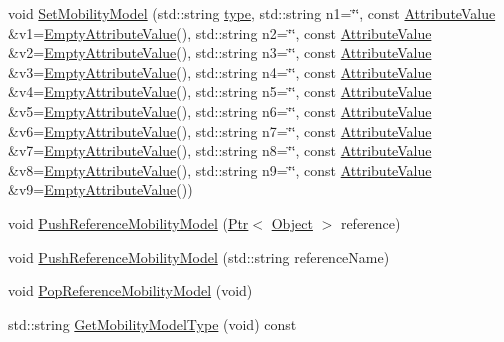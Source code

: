 \begin{DoxyCompactItemize}
void \hyperlink{classns3_1_1MobilityHelper_a030275011b6f40682e70534d30280aba}{Set\+Mobility\+Model} (std\+::string \hyperlink{visualizer-ideas_8txt_add98db9e15e2a58cf2b57623e7aa893a}{type}, std\+::string n1=\char`\"{}\char`\"{}, const \hyperlink{classns3_1_1AttributeValue}{Attribute\+Value} \&v1=\hyperlink{classns3_1_1EmptyAttributeValue}{Empty\+Attribute\+Value}(), std\+::string n2=\char`\"{}\char`\"{}, const \hyperlink{classns3_1_1AttributeValue}{Attribute\+Value} \&v2=\hyperlink{classns3_1_1EmptyAttributeValue}{Empty\+Attribute\+Value}(), std\+::string n3=\char`\"{}\char`\"{}, const \hyperlink{classns3_1_1AttributeValue}{Attribute\+Value} \&v3=\hyperlink{classns3_1_1EmptyAttributeValue}{Empty\+Attribute\+Value}(), std\+::string n4=\char`\"{}\char`\"{}, const \hyperlink{classns3_1_1AttributeValue}{Attribute\+Value} \&v4=\hyperlink{classns3_1_1EmptyAttributeValue}{Empty\+Attribute\+Value}(), std\+::string n5=\char`\"{}\char`\"{}, const \hyperlink{classns3_1_1AttributeValue}{Attribute\+Value} \&v5=\hyperlink{classns3_1_1EmptyAttributeValue}{Empty\+Attribute\+Value}(), std\+::string n6=\char`\"{}\char`\"{}, const \hyperlink{classns3_1_1AttributeValue}{Attribute\+Value} \&v6=\hyperlink{classns3_1_1EmptyAttributeValue}{Empty\+Attribute\+Value}(), std\+::string n7=\char`\"{}\char`\"{}, const \hyperlink{classns3_1_1AttributeValue}{Attribute\+Value} \&v7=\hyperlink{classns3_1_1EmptyAttributeValue}{Empty\+Attribute\+Value}(), std\+::string n8=\char`\"{}\char`\"{}, const \hyperlink{classns3_1_1AttributeValue}{Attribute\+Value} \&v8=\hyperlink{classns3_1_1EmptyAttributeValue}{Empty\+Attribute\+Value}(), std\+::string n9=\char`\"{}\char`\"{}, const \hyperlink{classns3_1_1AttributeValue}{Attribute\+Value} \&v9=\hyperlink{classns3_1_1EmptyAttributeValue}{Empty\+Attribute\+Value}())
\item 
void \hyperlink{classns3_1_1MobilityHelper_aa92205c4d93de77aad76e3aa62989310}{Push\+Reference\+Mobility\+Model} (\hyperlink{classns3_1_1Ptr}{Ptr}$<$ \hyperlink{classns3_1_1Object}{Object} $>$ reference)
\item 
void \hyperlink{classns3_1_1MobilityHelper_aaf5f02e5857ac4c97bb26e686dd2d18c}{Push\+Reference\+Mobility\+Model} (std\+::string reference\+Name)
\item 
void \hyperlink{classns3_1_1MobilityHelper_a90e82fc5584755f86a6d3fa10f25d984}{Pop\+Reference\+Mobility\+Model} (void)
\item 
std\+::string \hyperlink{classns3_1_1MobilityHelper_a5018a1b6f5840ae87587ae0664ec3dd6}{Get\+Mobility\+Model\+Type} (void) const 
\item 

\end{DoxyCompactItemize}
